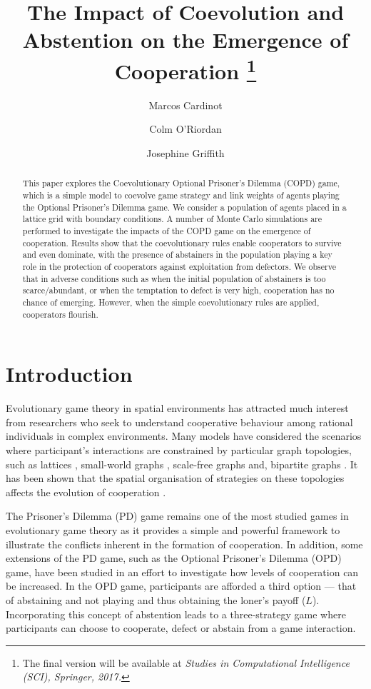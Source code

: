 \documentclass{llncs}
\title{
The Impact of Coevolution and Abstention on the Emergence of Cooperation
\thanks{The final version will be available at \textit{Studies in Computational Intelligence (SCI), Springer, 2017.}}
}
\author{Marcos Cardinot \and Colm O'Riordan \and Josephine Griffith}
\institute{Dept. of Information Technology, National University of Ireland, Galway, Ireland \\
\email{marcos.cardinot@nuigalway.ie}}
\begin{document}
\maketitle

\begin{abstract}

This paper explores the Coevolutionary Optional Prisoner's Dilemma (COPD) game,
which is a simple model to coevolve game strategy and link weights of agents
playing the Optional Prisoner's Dilemma game.
We consider a population of agents placed in a lattice grid with boundary conditions.
A number of Monte Carlo simulations are performed to investigate the impacts of
the COPD game on the emergence of cooperation.
Results show that the coevolutionary rules enable cooperators to survive and even
dominate, with the presence of abstainers in the population playing a key role
in the protection of cooperators against exploitation from defectors.
We observe that in adverse conditions such as when the initial population
of abstainers is too scarce/abundant, or when the temptation to defect is
very high, cooperation has no chance of emerging. However, when the simple coevolutionary
rules are applied, cooperators flourish.


\end{abstract}


\section{Introduction}
\label{sec:introduction}

Evolutionary game theory in spatial environments has attracted much interest
from researchers who seek to understand cooperative behaviour among rational
individuals in complex environments. Many models have considered the scenarios
where participant’s interactions are constrained by particular graph
topologies, such as lattices \cite{Hauert2002,Nowak1992}, small-world graphs
\cite{Chen2008,Fu2007}, scale-free graphs \cite{Szolnoki2016,Xia2015} and,
bipartite graphs \cite{Gomez2011}. It has been shown that the spatial
organisation of strategies on these topologies affects the evolution of
cooperation \cite{Cardinot2016sab}.

The Prisoner's Dilemma (PD) game remains one of the most studied games in
evolutionary game theory as it provides a simple and powerful framework to
illustrate the conflicts inherent in the formation of cooperation. In addition,
some extensions of the PD game, such as the Optional Prisoner's Dilemma (OPD)
game, have been studied in an effort to investigate how levels of cooperation
can be increased. In the OPD game, participants are afforded a third option ---
that of abstaining and not playing and thus obtaining the loner's payoff ($L$).
Incorporating this concept of abstention leads to a three-strategy game where
participants can choose to cooperate, defect or abstain from a game
interaction.
\end{document}
